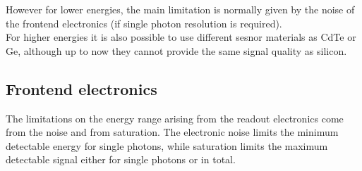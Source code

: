 However for lower energies, the main limitation is normally given by the noise of the frontend electronics (if single photon resolution is required).\\
For higher energies it is also possible to use different sesnor materials as CdTe or Ge, although up to now they cannot provide the same signal quality as silicon.


\subsection{Frontend electronics}

The limitations on the energy range arising from the readout electronics come from the noise and from saturation. 
The electronic noise  limits the minimum detectable energy for single photons, while saturation limits the maximum detectable signal either for single photons or in total.
